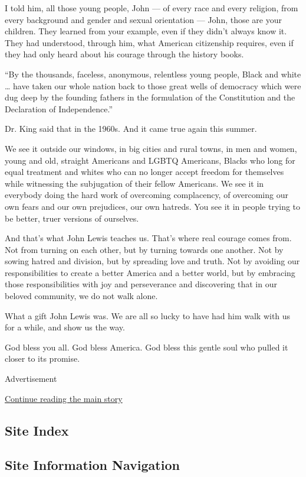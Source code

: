 I told him, all those young people, John --- of every race and every
religion, from every background and gender and sexual orientation ---
John, those are your children. They learned from your example, even if
they didn't always know it. They had understood, through him, what
American citizenship requires, even if they had only heard about his
courage through the history books.

``By the thousands, faceless, anonymous, relentless young people, Black
and white \ldots{} have taken our whole nation back to those great wells
of democracy which were dug deep by the founding fathers in the
formulation of the Constitution and the Declaration of Independence.''

Dr. King said that in the 1960s. And it came true again this summer.

We see it outside our windows, in big cities and rural towns, in men and
women, young and old, straight Americans and LGBTQ Americans, Blacks who
long for equal treatment and whites who can no longer accept freedom for
themselves while witnessing the subjugation of their fellow Americans.
We see it in everybody doing the hard work of overcoming complacency, of
overcoming our own fears and our own prejudices, our own hatreds. You
see it in people trying to be better, truer versions of ourselves.

And that's what John Lewis teaches us. That's where real courage comes
from. Not from turning on each other, but by turning towards one
another. Not by sowing hatred and division, but by spreading love and
truth. Not by avoiding our responsibilities to create a better America
and a better world, but by embracing those responsibilities with joy and
perseverance and discovering that in our beloved community, we do not
walk alone.

What a gift John Lewis was. We are all so lucky to have had him walk
with us for a while, and show us the way.

God bless you all. God bless America. God bless this gentle soul who
pulled it closer to its promise.

Advertisement

\protect\hyperlink{after-bottom}{Continue reading the main story}

\hypertarget{site-index}{%
\subsection{Site Index}\label{site-index}}

\hypertarget{site-information-navigation}{%
\subsection{Site Information
Navigation}\label{site-information-navigation}}


